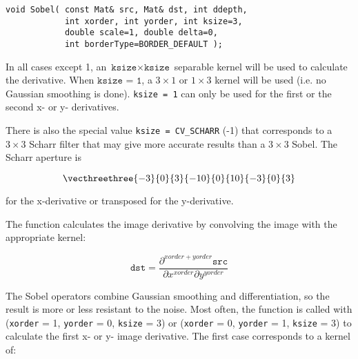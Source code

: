 \begin{lstlisting}
void Sobel( const Mat& src, Mat& dst, int ddepth,
            int xorder, int yorder, int ksize=3,
            double scale=1, double delta=0,
            int borderType=BORDER_DEFAULT );
\end{lstlisting}
\begin{description}
\end{description}

In all cases except 1, an $\texttt{ksize} \times
\texttt{ksize}$ separable kernel will be used to calculate the
derivative. When $\texttt{ksize = 1}$, a $ 3 \times 1$ or $ 1 \times 3$
kernel will be used (i.e. no Gaussian smoothing is done). \texttt{ksize = 1} can only be used for the first or the second x- or y- derivatives.

There is also the special value \texttt{ksize = CV\_SCHARR} (-1) that corresponds to a $3\times3$ Scharr
filter that may give more accurate results than a $3\times3$ Sobel. The Scharr
aperture is

\[ \vecthreethree
{-3}{0}{3}
{-10}{0}{10}
{-3}{0}{3}
\]

for the x-derivative or transposed for the y-derivative.

The function calculates the image derivative by convolving the image with the appropriate kernel:

\[
\texttt{dst} = \frac{\partial^{xorder+yorder} \texttt{src}}{\partial x^{xorder} \partial y^{yorder}}
\]

The Sobel operators combine Gaussian smoothing and differentiation,
so the result is more or less resistant to the noise. Most often,
the function is called with (\texttt{xorder} = 1, \texttt{yorder} = 0,
\texttt{ksize} = 3) or (\texttt{xorder} = 0, \texttt{yorder} = 1,
\texttt{ksize} = 3) to calculate the first x- or y- image
derivative. The first case corresponds to a kernel of:

